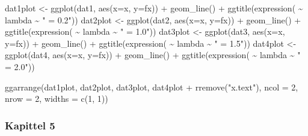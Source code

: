 \documentclass[
]{book}
\newenvironment{Shaded}{\begin{snugshade}}{\end{snugshade}}
\newcommand{\AttributeTok}[1]{\textcolor[rgb]{0.77,0.63,0.00}{#1}}
\newcommand{\DecValTok}[1]{\textcolor[rgb]{0.00,0.00,0.81}{#1}}
\newcommand{\FunctionTok}[1]{\textcolor[rgb]{0.00,0.00,0.00}{#1}}
\newcommand{\NormalTok}[1]{#1}
\newcommand{\OtherTok}[1]{\textcolor[rgb]{0.56,0.35,0.01}{#1}}
\newcommand{\SpecialCharTok}[1]{\textcolor[rgb]{0.00,0.00,0.00}{#1}}
\newcommand{\StringTok}[1]{\textcolor[rgb]{0.31,0.60,0.02}{#1}}
\begin{document}
\begin{Shaded}
\begin{Highlighting}[]
\NormalTok{dat1plot }\OtherTok{\textless{}{-}} \FunctionTok{ggplot}\NormalTok{(dat1, }\FunctionTok{aes}\NormalTok{(}\AttributeTok{x=}\NormalTok{x, }\AttributeTok{y=}\NormalTok{fx)) }\SpecialCharTok{+} \FunctionTok{geom\_line}\NormalTok{() }\SpecialCharTok{+} \FunctionTok{ggtitle}\NormalTok{(}\FunctionTok{expression}\NormalTok{( }\SpecialCharTok{\textasciitilde{}}\NormalTok{ lambda }\SpecialCharTok{\textasciitilde{}} \StringTok{" = 0.2"}\NormalTok{))}
\NormalTok{dat2plot }\OtherTok{\textless{}{-}} \FunctionTok{ggplot}\NormalTok{(dat2, }\FunctionTok{aes}\NormalTok{(}\AttributeTok{x=}\NormalTok{x, }\AttributeTok{y=}\NormalTok{fx)) }\SpecialCharTok{+} \FunctionTok{geom\_line}\NormalTok{() }\SpecialCharTok{+} \FunctionTok{ggtitle}\NormalTok{(}\FunctionTok{expression}\NormalTok{( }\SpecialCharTok{\textasciitilde{}}\NormalTok{ lambda }\SpecialCharTok{\textasciitilde{}} \StringTok{" = 1.0"}\NormalTok{))}
\NormalTok{dat3plot }\OtherTok{\textless{}{-}} \FunctionTok{ggplot}\NormalTok{(dat3, }\FunctionTok{aes}\NormalTok{(}\AttributeTok{x=}\NormalTok{x, }\AttributeTok{y=}\NormalTok{fx)) }\SpecialCharTok{+} \FunctionTok{geom\_line}\NormalTok{() }\SpecialCharTok{+} \FunctionTok{ggtitle}\NormalTok{(}\FunctionTok{expression}\NormalTok{( }\SpecialCharTok{\textasciitilde{}}\NormalTok{ lambda }\SpecialCharTok{\textasciitilde{}} \StringTok{" = 1.5"}\NormalTok{))}
\NormalTok{dat4plot }\OtherTok{\textless{}{-}} \FunctionTok{ggplot}\NormalTok{(dat4, }\FunctionTok{aes}\NormalTok{(}\AttributeTok{x=}\NormalTok{x, }\AttributeTok{y=}\NormalTok{fx)) }\SpecialCharTok{+} \FunctionTok{geom\_line}\NormalTok{() }\SpecialCharTok{+} \FunctionTok{ggtitle}\NormalTok{(}\FunctionTok{expression}\NormalTok{( }\SpecialCharTok{\textasciitilde{}}\NormalTok{ lambda }\SpecialCharTok{\textasciitilde{}} \StringTok{" = 2.0"}\NormalTok{))}

\FunctionTok{ggarrange}\NormalTok{(dat1plot, dat2plot, dat3plot, dat4plot }\SpecialCharTok{+} \FunctionTok{rremove}\NormalTok{(}\StringTok{"x.text"}\NormalTok{), }\AttributeTok{ncol =} \DecValTok{2}\NormalTok{, }\AttributeTok{nrow =} \DecValTok{2}\NormalTok{,  }\AttributeTok{widths =} \FunctionTok{c}\NormalTok{(}\DecValTok{1}\NormalTok{, }\DecValTok{1}\NormalTok{))}
\end{Highlighting}
\end{Shaded}

\hypertarget{kapittel-5}{%
\subsubsection*{Kapittel 5}\label{kapittel-5}}
\end{document}
